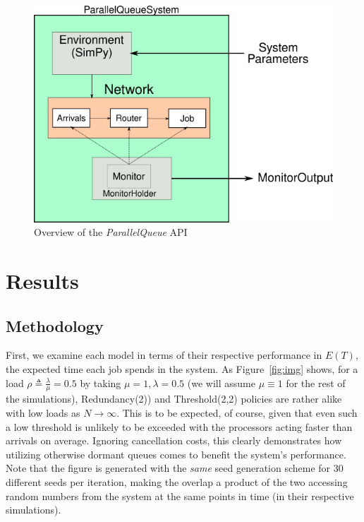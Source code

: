 \begin{figure}
    \centering
    \includegraphics[scale=0.7]{pq}
    \caption{Overview of the \textit{ParallelQueue} API}
    \label{fig:API}
\end{figure}


\section{Results}\label{sec:results}

\subsection{Methodology}\label{subsec:methodology}
First, we examine each model in terms of their respective performance in $E(T)$, the expected time each job spends in the system.
As Figure~\ref{fig:img} shows, for a load $\rho \triangleq \frac{\lambda}{\mu} = 0.5$ by taking $\mu=1, \lambda = 0.5$ (we will assume $\mu \equiv 1$ for the
rest of the simulations), Redundancy(2)) and Threshold(2,2) policies are rather alike with low loads as $N \rightarrow \infty$. This is to be expected, of course, given that even such a low threshold is unlikely to be exceeded with the processors acting faster than arrivals on average. Ignoring cancellation costs, this clearly demonstrates how utilizing otherwise dormant queues comes to benefit the system's performance. Note that the figure is generated with the \textit{same} seed generation scheme for 30 different seeds per iteration, making the overlap a product of the two accessing random numbers from the system at the same points in time (in their respective simulations).

